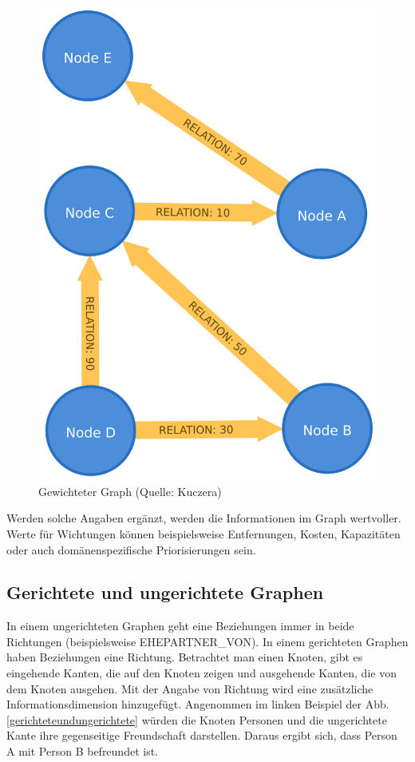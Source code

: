 \documentclass[ngerman,]{scrreprt}
\begin{document}
\begin{figure}
\centering
\includegraphics{Bilder/weightedGraph.png}
\caption{Gewichteter Graph (Quelle: Kuczera)}
\label{gewichteter}
\end{figure}

Werden solche Angaben ergänzt, werden die Informationen im Graph wertvoller. Werte für Wichtungen können beispielsweise Entfernungen, Kosten, Kapazitäten oder auch domänenspezifische Priorisierungen sein.

\hypertarget{gerichtete-und-ungerichtete-graphen}{%
\subsection{Gerichtete und ungerichtete Graphen}\label{gerichtete-und-ungerichtete-graphen}}

In einem ungerichteten Graphen geht eine Beziehungen immer in beide Richtungen (beispielsweise EHEPARTNER\_VON). In einem gerichteten Graphen haben Beziehungen eine Richtung. Betrachtet man einen Knoten, gibt es eingehende Kanten, die auf den Knoten zeigen und ausgehende Kanten, die von dem Knoten ausgehen. Mit der Angabe von Richtung wird eine zusätzliche Informationsdimension hinzugefügt. Angenommen im linken Beispiel der Abb. \ref{gerichteteundungerichtete} würden die Knoten Personen und die ungerichtete Kante ihre gegenseitige Freundschaft darstellen. Daraus ergibt sich, dass Person A mit Person B befreundet ist.
\end{document}
